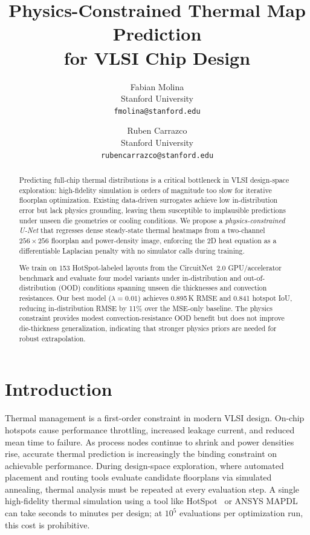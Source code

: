 \documentclass[10pt,twocolumn,letterpaper]{article}
\begin{document}
\title{Physics-Constrained Thermal Map Prediction\\
for VLSI Chip Design}

\author{Fabian Molina\\
Stanford University\\
{\tt\small fmolina@stanford.edu}
\and
Ruben Carrazco\\
Stanford University\\
{\tt\small rubencarrazco@stanford.edu}
}

\maketitle

\begin{abstract}
Predicting full-chip thermal distributions is a critical bottleneck in
VLSI design-space exploration: high-fidelity simulation is orders of
magnitude too slow for iterative floorplan optimization. Existing
data-driven surrogates achieve low in-distribution error but lack
physics grounding, leaving them susceptible to implausible predictions
under unseen die geometries or cooling conditions. We propose a
\emph{physics-constrained U-Net} that regresses dense steady-state
thermal heatmaps from a two-channel $256\times256$ floorplan and
power-density image, enforcing the 2D heat equation as a differentiable
Laplacian penalty with no simulator calls during training.

We train on 153 HotSpot-labeled layouts from the CircuitNet~2.0
GPU/accelerator benchmark and evaluate four model variants under
in-distribution and out-of-distribution (OOD) conditions spanning
unseen die thicknesses and convection resistances. Our best model
($\lambda{=}0.01$) achieves 0.895\,K RMSE and 0.841 hotspot IoU,
reducing in-distribution RMSE by 11\% over the MSE-only baseline. The
physics constraint provides modest convection-resistance OOD benefit
but does not improve die-thickness generalization, indicating that
stronger physics priors are needed for robust extrapolation.
\end{abstract}

\section{Introduction}
Thermal management is a first-order constraint in modern VLSI design. On-chip hotspots cause performance throttling, increased leakage
current, and reduced mean time to failure. As process nodes continue
to shrink and power densities rise, accurate thermal prediction is
increasingly the binding constraint on achievable performance.
During design-space exploration, where automated placement and routing
tools evaluate candidate floorplans via simulated annealing, thermal
analysis must be repeated at every evaluation step. A single high-fidelity thermal
simulation using a tool like HotSpot~\cite{HotSpot} or ANSYS MAPDL
can take seconds to minutes per design; at $10^5$ evaluations per
optimization run, this cost is prohibitive.
\end{document}
